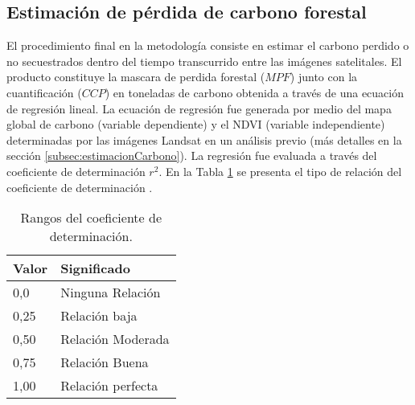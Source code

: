 \subsection{Estimaci\'on de p\'erdida de carbono forestal}
El procedimiento final en la metodolog\'ia consiste en estimar el carbono perdido o no secuestrados dentro del tiempo transcurrido entre las im\'agenes satelitales. El producto constituye la mascara de perdida forestal ($ MPF $) junto con la cuantificaci\'on ($ CCP $) en toneladas de carbono obtenida a trav\'es de una ecuaci\'on de regresi\'on lineal. La ecuaci\'on de regresi\'on fue generada por medio del mapa global de carbono (variable dependiente) \cite{saatchi2011benchmark} y el NDVI (variable independiente) determinadas por las im\'agenes Landsat en un an\'alisis previo (m\'as detalles en la secci\'on \ref{subsec:estimacionCarbono}). La regresi\'on fue evaluada a trav\'es del coeficiente de determinaci\'on $ r^{2} $. En la Tabla \ref{t:coefDeter} se presenta el tipo de relaci\'on del coeficiente de determinaci\'on \cite{kris2014estimacionCorr}.
\begin{table}[H]
	\centering
	\begin{tabular}{|l|l|}
		\hline
		\textbf{Valor} & \textbf{Significado} \\ \hline
		0,0            & Ninguna Relaci\'on     \\ \hline
		0,25           & Relaci\'on baja        \\ \hline
		0,50           & Relaci\'on Moderada    \\ \hline
		0,75           & Relaci\'on Buena       \\ \hline
		1,00           & Relaci\'on perfecta    \\ \hline
	\end{tabular}
	\caption{Rangos del coeficiente de determinaci\'on.}
	\label{t:coefDeter}
\end{table}

